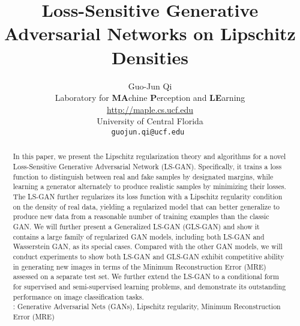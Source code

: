 \documentclass[11pt,fullpage, letterpaper,twoside]{article}
\newcommand{\1}[1]{\mathds{1}_{\left[#1\right]}}
\begin{document}
\title{Loss-Sensitive Generative Adversarial Networks on Lipschitz Densities}




\author{Guo-Jun Qi \\
Laboratory for {\bf MA}chine {\bf P}erception and {\bf LE}arning \\
\url{http://maple.cs.ucf.edu}\\
University of Central Florida\\
\tt\small guojun.qi@ucf.edu          }





\date{}

\maketitle

\begin{abstract}

In this paper, we present the Lipschitz regularization theory and algorithms for a novel Loss-Sensitive Generative Adversarial Network (LS-GAN). Specifically, it trains a loss function to distinguish between real and fake samples by designated margins, while learning a generator alternately to produce realistic samples by minimizing their losses.
The LS-GAN further regularizes its loss function with a Lipschitz regularity condition on the density of real data, yielding a regularized model that can better generalize to produce new data from a reasonable number of training examples than the classic GAN.
We will further present a Generalized LS-GAN (GLS-GAN) and show it contains a large family of regularized GAN models, including both LS-GAN and Wasserstein GAN, as its special cases.  Compared with the other GAN models, we will conduct experiments to show both LS-GAN and GLS-GAN exhibit competitive ability in generating new images in terms of the Minimum Reconstruction Error (MRE) assessed on a separate test set.
We further extend the LS-GAN to a conditional form for supervised and semi-supervised learning problems, and demonstrate its outstanding performance on image classification tasks.\\
{: Generative Adversarial Nets (GANs), Lipschitz regularity, Minimum Reconstruction Error (MRE)}

\end{abstract}





\maketitle
\end{document}
